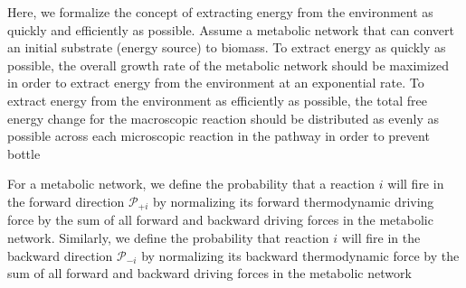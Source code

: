 Here, we formalize the concept of extracting energy from the environment as quickly and efficiently as possible. Assume a metabolic network that can convert an initial substrate (energy source) to biomass. To extract energy as quickly as possible, the overall growth rate of the metabolic network should be maximized in order to extract energy from the environment at an exponential rate.   To extract energy from the environment as efficiently as possible, the total free energy change for the macroscopic reaction should be distributed as evenly as possible across each microscopic reaction in the pathway in order to prevent bottle


For a metabolic network, we define the probability that a reaction $i$ will fire in the forward  direction ${\mathcal P_{+i}}$ by normalizing its forward thermodynamic driving force by the sum of all forward and backward driving forces in the metabolic network. Similarly, we define the probability that reaction $i$ will fire in the backward direction $\mathcal P_{-i}$ by normalizing its backward thermodynamic force by  the sum of all forward and backward driving forces in the metabolic network